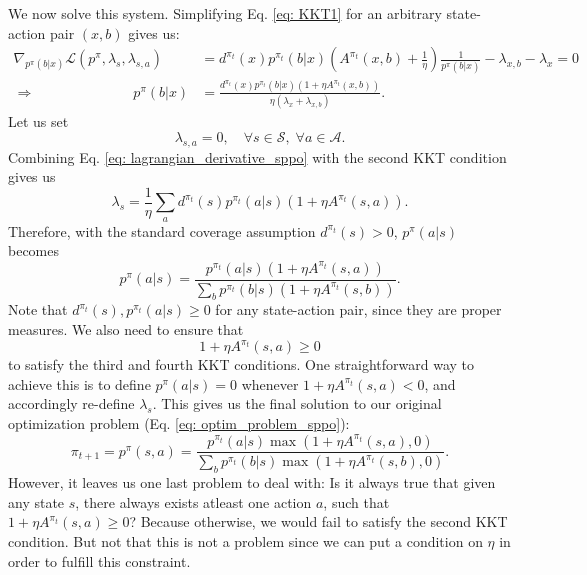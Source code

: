 \documentclass[a4paper, 10pt]{article}
\begin{document}
We now solve this system. Simplifying Eq. \ref{eq: KKT1} for an arbitrary state-action pair $(x, b)$ gives us:
\begin{align}
  \nabla_{p^\pi(b | x)} \mathcal{L}(p^\pi, \lambda_s, \lambda_{s, a}) &= d^{\pi_t}(x) p^{\pi_t}(b|x) \left( A^{\pi_t}(x, b) + \frac{1}{\eta} \right) \frac{1}{p^\pi(b|x)} - \lambda_{x, b} - \lambda_x = 0 \nonumber \\
  \Rightarrow \qquad \qquad \qquad \quad p^\pi(b | x) &= \frac{d^{\pi_t}(x) p^{\pi_t}(b|x) (1 + \eta A^{\pi_t}(x, b))}{\eta (\lambda_x + \lambda_{x, b})}. \label{eq: lagrangian_derivative_sppo}
\end{align}
Let us set 
\begin{equation}
  \lambda_{s, a} = 0, \quad \forall s \in \mathcal{S}, \; \forall a \in \mathcal{A}.
\end{equation}
Combining Eq. \ref{eq: lagrangian_derivative_sppo} with the second KKT condition gives us
\begin{equation}
  \lambda_s = \frac{1}{\eta} \sum_a d^{\pi_t}(s) p^{\pi_t}(a|s) (1 + \eta A^{\pi_t}(s, a)).
\end{equation}
Therefore, with the standard coverage assumption $d^{\pi_t}(s) > 0$, $p^\pi(a | s)$ becomes
\begin{equation}
  p^\pi(a | s) = \frac{p^{\pi_t}(a|s) (1 + \eta A^{\pi_t}(s, a))}{\sum_b p^{\pi_t}(b|s) (1 + \eta A^{\pi_t}(s, b))}.
\end{equation}
Note that $d^{\pi_t}(s), p^{\pi_t}(a|s) \geq 0$ for any state-action pair, since they are proper measures. We also need to ensure that
\begin{equation*}
  1 + \eta A^{\pi_t}(s, a) \geq 0
\end{equation*}
to satisfy the third and fourth KKT conditions. One straightforward way to achieve this is to define $p^\pi(a | s) = 0$ whenever $1 + \eta A^{\pi_t}(s, a) < 0$, and accordingly re-define $\lambda_s$. This gives us the final solution to our original optimization problem (Eq. \ref{eq: optim_problem_sppo}):
\begin{equation}
  \pi_{t+1} = p^\pi(s, a) = \frac{p^{\pi_t}(a|s) \max(1 + \eta A^{\pi_t}(s, a), 0)}{\sum_b p^{\pi_t}(b|s) \max(1 + \eta A^{\pi_t}(s, b), 0)}.
\end{equation}
However, it leaves us one last problem to deal with: Is it always true that given any state $s$, there always exists atleast one action $a$, such that $1 + \eta A^{\pi_t}(s, a) \geq 0$? Because otherwise, we would fail to satisfy the second KKT condition. But not that this is not a problem since we can put a condition on $\eta$ in order to fulfill this constraint.
\end{document}
